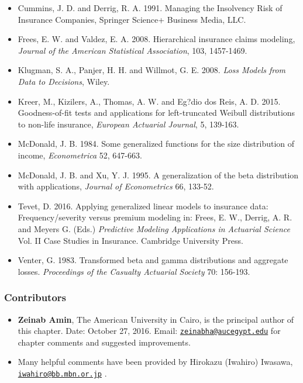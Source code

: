 \documentclass[]{book}
\begin{document}
\begin{itemize}
\item
  Cummins, J. D. and Derrig, R. A. 1991. Managing the Insolvency Risk of
  Insurance Companies, Springer Science+ Business Media, LLC.
\item
  Frees, E. W. and Valdez, E. A. 2008. Hierarchical insurance claims
  modeling, \emph{Journal of the American Statistical Association}, 103,
  1457-1469.
\item
  Klugman, S. A., Panjer, H. H. and Willmot, G. E. 2008. \emph{Loss
  Models from Data to Decisions}, Wiley.
\item
  Kreer, M., Kizilers, A., Thomas, A. W. and Eg?dio dos Reis, A. D.
  2015. Goodness-of-fit tests and applications for left-truncated
  Weibull distributions to non-life insurance, \emph{European Actuarial
  Journal}, 5, 139-163.
\item
  McDonald, J. B. 1984. Some generalized functions for the size
  distribution of income, \emph{Econometrica} 52, 647-663.
\item
  McDonald, J. B. and Xu, Y. J. 1995. A generalization of the beta
  distribution with applications, \emph{Journal of Econometrics} 66,
  133-52.
\item
  Tevet, D. 2016. Applying generalized linear models to insurance data:
  Frequency/severity versus premium modeling in: Frees, E. W., Derrig,
  A. R. and Meyers G. (Eds.) \emph{Predictive Modeling Applications in
  Actuarial Science} Vol. II Case Studies in Insurance. Cambridge
  University Press.
\item
  Venter, G. 1983. Transformed beta and gamma distributions and
  aggregate losses. \emph{Proceedings of the Casualty Actuarial Society}
  70: 156-193.
\end{itemize}

\subsubsection*{Contributors}\label{contributors}

\begin{itemize}
\item
  \textbf{Zeinab Amin}, The American University in Cairo, is the
  principal author of this chapter. Date: October 27, 2016. Email:
  \href{mailto:zeinabha@aucegypt.edu}{\nolinkurl{zeinabha@aucegypt.edu}}
  for chapter comments and suggested improvements.
\item
  Many helpful comments have been provided by Hirokazu (Iwahiro)
  Iwasawa,
  \href{mailto:iwahiro@bb.mbn.or.jp}{\nolinkurl{iwahiro@bb.mbn.or.jp}} .
\end{itemize}
\end{document}
